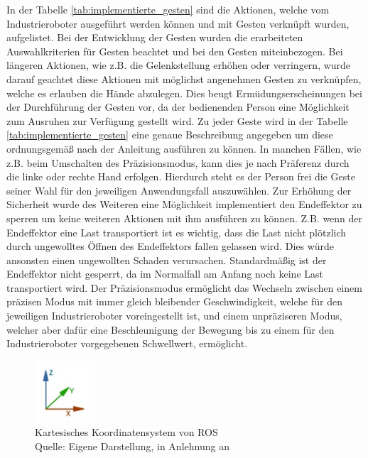 In der Tabelle \ref{tab:implementierte_gesten} sind die Aktionen, welche vom Industrieroboter ausgeführt werden können und mit Gesten verknüpft wurden, aufgelistet. Bei der Entwicklung der Gesten wurden die erarbeiteten Auswahlkriterien für Gesten beachtet und bei den Gesten miteinbezogen. Bei längeren Aktionen, wie z.B. die Gelenkstellung erhöhen oder verringern, wurde darauf geachtet diese Aktionen mit möglichst angenehmen Gesten zu verknüpfen, welche es erlauben die Hände abzulegen. Dies beugt Ermüdungserscheinungen bei der Durchführung der Gesten vor, da der bedienenden Person eine Möglichkeit zum Ausruhen zur Verfügung gestellt wird. Zu jeder Geste wird in der Tabelle \ref{tab:implementierte_gesten} eine genaue Beschreibung angegeben um diese ordnungsgemäß nach der Anleitung ausführen zu können. In manchen Fällen, wie z.B. beim Umschalten des Präzisionsmodus, kann dies je nach Präferenz durch die linke oder rechte Hand erfolgen. Hierdurch steht es der Person frei die Geste seiner Wahl für den jeweiligen Anwendungsfall auszuwählen. Zur Erhöhung der Sicherheit wurde des Weiteren eine Möglichkeit implementiert den Endeffektor zu sperren um keine weiteren Aktionen mit ihm ausführen zu können. Z.B. wenn der Endeffektor eine Last transportiert ist es wichtig, dass die Last nicht plötzlich durch ungewolltes Öffnen des Endeffektors fallen gelassen wird. Dies würde ansonsten einen ungewollten Schaden verursachen. Standardmäßig ist der Endeffektor nicht gesperrt, da im Normalfall am Anfang noch keine Last transportiert wird. Der Präzisionsmodus ermöglicht das Wechseln zwischen einem präzisen Modus mit immer gleich bleibender Geschwindigkeit, welche für den jeweiligen Industrieroboter voreingestellt ist, und einem unpräziseren Modus, welcher aber dafür eine Beschleunigung der Bewegung bis zu einem für den Industrieroboter vorgegebenen Schwellwert, ermöglicht.

\begin{figure}[htb]
	\centering
	\includegraphics[width=0.2\textwidth]{images/loesungsweg/ros_coordinate_system}
	\caption[Kartesisches Koordinatensystem von ROS]{Kartesisches Koordinatensystem von ROS\\Quelle: Eigene Darstellung, in Anlehnung an \cite{guo_irc-set_2019}}
	\label{fig:ros_coordinate_system}
\end{figure}
\FloatBarrier

